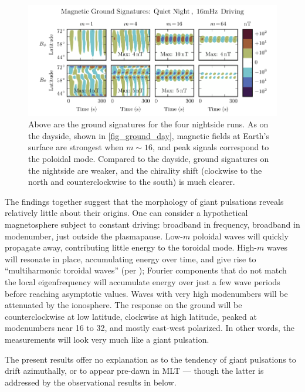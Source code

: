 \documentclass[draft,linenumbers]{agujournal}
\begin{document}
\begin{figure}
    \begin{center}
    \includegraphics[width=\textwidth]{figures/fig_ground_night.pdf}
    \caption{
        Above are the ground signatures for the four nightside runs. As on the dayside, shown in \cref{fig_ground_day}, magnetic fields at Earth's surface are strongest when $m \sim 16$, and peak signals correspond to the poloidal mode. Compared to the dayside, ground signatures on the nightside are weaker, and the chirality shift (clockwise to the north and counterclockwise to the south) is much clearer.
    }
    \label{fig_ground_night}
    \end{center}
\end{figure}

The findings together suggest that the morphology of giant pulsations reveals relatively little about their origins. One can consider a hypothetical magnetosphere subject to constant driving: broadband in frequency, broadband in modenumber, just outside the plasmapause. Low-$m$ poloidal waves will quickly propagate away, contributing little energy to the toroidal mode. High-$m$ waves will resonate in place, accumulating energy over time, and give rise to ``multiharmonic toroidal waves'' (per \citet{takahashi_2011}); Fourier components that do not match the local eigenfrequency will accumulate energy over just a few wave periods before reaching asymptotic values. Waves with very high modenumbers will be attenuated by the ionosphere. The response on the ground will be counterclockwise at low latitude, clockwise at high latitude, peaked at modenumbers near 16 to 32, and mostly east-west polarized. In other words, the measurements will look very much like a giant pulsation.

The present results offer no explanation as to the tendency of giant pulsations to drift azimuthally, or to appear pre-dawn in MLT --- though the latter is addressed by the observational results in below.
\end{document}
